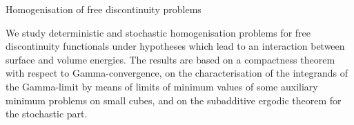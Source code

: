 \mypage
{}
\begin{myabstract}
Homogenisation of free discontinuity problems

We study deterministic and stochastic homogenisation problems for free discontinuity functionals under hypotheses which lead to an interaction between surface and volume energies. The results are based on a compactness theorem with respect to Gamma-convergence, on the characterisation of the integrands of the Gamma-limit by means of limits of minimum values of some auxiliary minimum problems on small cubes, and on the subadditive ergodic theorem for the stochastic part.
\end{myabstract}
